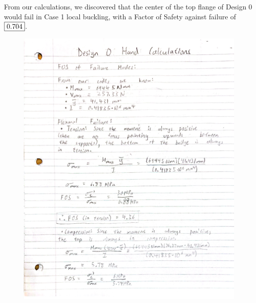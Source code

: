 \documentclass[11pt]{article}
\begin{document}
From our calculations, we discovered that the center of the top flange of Design 0 would fail in Case 1 local buckling, with a Factor of Safety against failure of $\fbox{0.704}$.
\begin{figure}[H]
    \centering
    \includegraphics[width=0.95\linewidth]{images/D0 Hand Calcs P1.png}
\end{figure}
\end{document}
